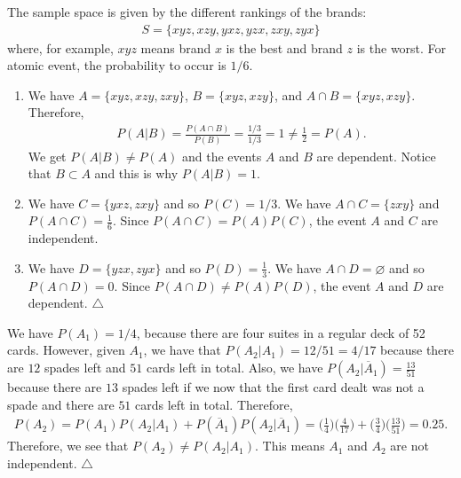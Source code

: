 	\begin{problem}
	The sample space is given by the different rankings of the brands: 
		\begin{align*}
		S = \{ xyz, xzy, yxz, yzx, zxy, zyx \}
		\end{align*}
	where, for example, $xyz$ means brand $x$ is the best and brand $z$ is the worst. For atomic event, the probability to occur is $1/6$.
	
	\begin{enumerate}[label=\alph*)]
	\item We have $A = \{ xyz, xzy, zxy \}$, $B = \{ xyz, xzy \}$, and $A \cap B = \{ xyz , xzy \}$. Therefore,
		\begin{align*}
		P (A | B) = \frac{P (A \cap B)}{P (B)} = \frac{1/3}{1/3} = 1 \neq \frac{1}{2} = P (A) .
		\end{align*}
	We get $P (A | B) \neq P (A)$ and the events $A$ and $B$ are dependent. Notice that $B \subset A$ and this is why $P (A | B) = 1$.
	\item We have $C = \{ yxz , zxy \}$ and so $P (C) = 1/3$. We have $A \cap C = \{ zxy \}$ and $P (A \cap C) = \frac{1}{6}$. Since $P (A \cap C) = P (A) P (C)$, the event $A$ and $C$ are independent.
	
	\item We have $D = \{ yzx , zyx \}$ and so $P (D) = \frac{1}{3}$. We have $A \cap D = \varnothing$ and so $P (A \cap D ) = 0$. Since $P (A \cap D) \neq P (A) P (D)$, the event $A$ and $D$ are dependent. \hfill $\triangle$
	\end{enumerate}
	\end{problem}
	
	\begin{problem}
	We have $P (A_1) = 1/4$, because there are four suites in a regular deck of 52 cards. However, given $A_1$, we have that $P (A_2 | A_1) = 12 / 51 = 4 / 17$ because there are $12$ spades left and $51$ cards left in total. Also, we have $P (A_2 | \overline{A}_1 ) = \frac{13}{51}$ because there are $13$ spades left if we now that the first card dealt was not a spade and there are $51$ cards left in total. Therefore,
		\begin{align*}
		P (A_2) = P (A_1) P (A_2 | A_1) + P (\overline{A}_1) P (A_2 | \overline{A}_1) = \Big( \frac{1}{4} \Big) \Big( \frac{4}{17} \Big) + \Big( \frac{3}{4} \Big) \Big( \frac{13}{51} \Big) = 0.25 .
		\end{align*}
	Therefore, we see that $P (A_2) \neq P (A_2 | A_1 )$. This means $A_1$ and $A_2$ are not independent. \hfill $\triangle$
	\end{problem}


